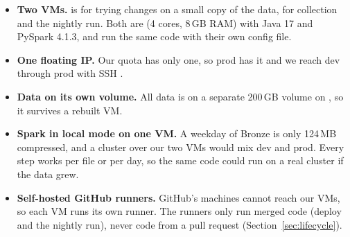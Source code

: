 \begin{itemize}
  \item \textbf{Two VMs.}  is for trying changes on a small copy of the data,
         for collection and the nightly run. Both are 
        (4 cores, 8\,GB RAM) with Java 17 and PySpark 4.1.3, and run the same code with their
        own config file.
  \item \textbf{One floating IP.} Our quota has only one, so prod has it and we reach dev
        through prod with SSH .
  \item \textbf{Data on its own volume.} All data is on a separate 200\,GB volume on
        , so it survives a rebuilt VM.
  \item \textbf{Spark in local mode on one VM.} A weekday of Bronze is only 124\,MB compressed,
        and a cluster over our two VMs would mix dev and prod. Every step works per file or per
        day, so the same code could run on a real cluster if the data grew.
  \item \textbf{Self-hosted GitHub runners.} GitHub's machines cannot reach our VMs, so each
        VM runs its own runner. The runners only run merged code (deploy and the nightly run),
        never code from a pull request (Section~\ref{sec:lifecycle}).
  \end{itemize}
